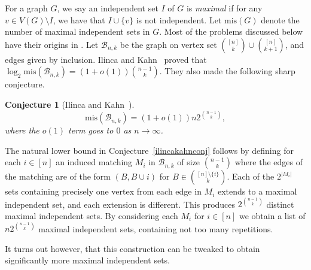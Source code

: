 \documentclass[11pt]{article}
\newtheorem{conj}[theorem]{Conjecture}
\numberwithin{equation}{section}
\def\B{\mathcal{B}}
\def\mis{\text{mis}}
\begin{document}
For a graph $G$, we say an independent set $I$ of $G$ is  \emph{maximal} if for any $v\in V(G)\setminus I$, we have that $I\cup\{v\}$ is not independent. Let $\mis(G)$ denote the number of maximal independent sets in $G$. Most of the problems discussed below have their origins in \cite{duffusfranklrodl}. Let $\B_{n,k}$ be the graph on vertex set $\binom{[n]}{k}\cup\binom{[n]}{k+1}$, and edges given by inclusion. 
Ilinca and Kahn~\cite{IK} proved that  $\log_2 \mis (\B_{n,k})=(1+o(1))\binom{n-1}{k}$. They also made the following sharp conjecture.
\begin{conj}[\label{ilincakahnconj}Ilinca and Kahn~\cite{IK}]
$$\mis (\B _{n,k})=(1+o(1))n2^{\binom{n-1}{k}},$$
where the $o(1)$ term goes to $0$ as $n\rightarrow \infty$.
\end{conj} 
 The natural lower bound in Conjecture~\ref{ilincakahnconj} follows by defining for each $i\in [n]$ an induced matching $M_i$ in $\B_{n,k}$ of size $\binom{n-1}{k}$
where the edges of the matching are of the form $(B,B\cup{i})$ for $B \in \binom{[n]\setminus \{i\}}{k}$. 
Each of the $2^{|M_i|}$ sets containing precisely one vertex from each edge in $M_i$ extends to a maximal independent set, and each extension is different. This produces
$2^{\binom{n-1}{k}}$ distinct maximal independent sets. By considering each $M_i$ for $i\in[n]$ we obtain a list of $n2^{\binom{n-1}{k}}$ maximal independent sets, containing not too many repetitions.

It turns out however, that this construction can be tweaked to obtain significantly more maximal independent sets.
\end{document}

